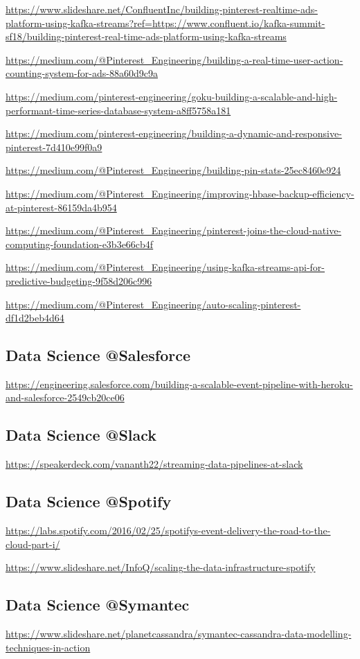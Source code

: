 \documentclass[12pt]{scrartcl} %
\begin{document}
\url{https://www.slideshare.net/ConfluentInc/building-pinterest-realtime-ads-platform-using-kafka-streams?ref=https://www.confluent.io/kafka-summit-sf18/building-pinterest-real-time-ads-platform-using-kafka-streams}

\url{https://medium.com/@Pinterest_Engineering/building-a-real-time-user-action-counting-system-for-ads-88a60d9c9a}

\url{https://medium.com/pinterest-engineering/goku-building-a-scalable-and-high-performant-time-series-database-system-a8ff5758a181}

\url{https://medium.com/pinterest-engineering/building-a-dynamic-and-responsive-pinterest-7d410e99f0a9}

\url{https://medium.com/@Pinterest_Engineering/building-pin-stats-25ec8460e924}

\url{https://medium.com/@Pinterest_Engineering/improving-hbase-backup-efficiency-at-pinterest-86159da4b954}

\url{https://medium.com/@Pinterest_Engineering/pinterest-joins-the-cloud-native-computing-foundation-e3b3e66cb4f}

\url{https://medium.com/@Pinterest_Engineering/using-kafka-streams-api-for-predictive-budgeting-9f58d206c996}

\url{https://medium.com/@Pinterest_Engineering/auto-scaling-pinterest-df1d2beb4d64}

\subsection{Data Science @Salesforce}
\url{https://engineering.salesforce.com/building-a-scalable-event-pipeline-with-heroku-and-salesforce-2549cb20ce06}

\subsection{Data Science @Slack}
\url{https://speakerdeck.com/vananth22/streaming-data-pipelines-at-slack}

\subsection{Data Science @Spotify}
\url{https://labs.spotify.com/2016/02/25/spotifys-event-delivery-the-road-to-the-cloud-part-i/}

\url{https://www.slideshare.net/InfoQ/scaling-the-data-infrastructure-spotify}

\subsection{Data Science @Symantec}
\url{https://www.slideshare.net/planetcassandra/symantec-cassandra-data-modelling-techniques-in-action}
\end{document}

